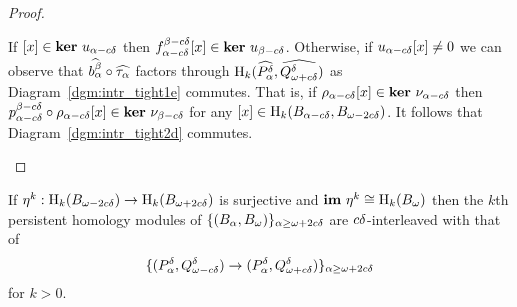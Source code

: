 \begin{proof}
\begin{enumerate}[label=\Roman*.]
    If $[x]\in\mathbf{ker}~u_{\alpha-c{\delta}}$ then $f_{\alpha - c{\delta}}^{\beta-c{\delta}}[x]\in\mathbf{ker}~u_{\beta-c{\delta}}$.
    Otherwise, if $u_{\alpha-c{\delta}}[x]\neq 0$ we can observe that $\widehat{b_\alpha^\beta}\circ\widehat{\tau_\alpha}$ factors through $\mathrm{H}_k(\widehat{P^{{\delta}}_\alpha}, \widehat{Q_{\omega + c{\delta}}^{\delta}})$ as Diagram~\ref{dgm:intr_tight1e} commutes.
    That is, if $\rho_{\alpha -c{\delta}}[x]\in\mathbf{ker}~\nu_{\alpha-c{\delta}}$ then $p_{\alpha-c{\delta}}^{\beta-c{\delta}}\circ\rho_{\alpha-c{\delta}}[x]\in\mathbf{ker}~\nu_{\beta-c{\delta}}$ for any $[x]\in \mathrm{H}_k(B_{\alpha-c{\delta}}, B_{\omega - 2c{\delta}})$.
    It follows that Diagram~\ref{dgm:intr_tight2d} commutes.
  \end{enumerate}
\end{proof}

\begin{corollary}\label{cor:geo_inter}
  If $\eta^k : \mathrm{H}_k(B_{\omega - 2c{\delta}})\to \mathrm{H}_k(B_{\omega + 2c{\delta}})$ is surjective and $\mathbf{im}~\eta^k\cong \mathrm{H}_k(B_\omega)$ then the $k$th persistent homology modules of
  $\{(B_\alpha, B_\omega)\}_{\alpha\geq\omega + 2c{\delta}}$ are $c{\delta}$-interleaved with that of
  \[\{(P_\alpha^{\delta}, Q_{\omega - c{\delta}}^{\delta})\to (P_\alpha^{\delta}, Q_{\omega + c{\delta}}^{\delta})\}_{\alpha\geq\omega + 2c{\delta}}\]
  for $k > 0$.
\end{corollary}
